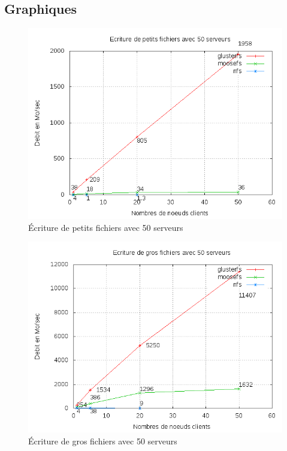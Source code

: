 \documentclass[blue]{beamer}
\begin{document}
	\subsection{Graphiques}
		\begin{frame}
			\begin{figure}
				\includegraphics[width=0.75\linewidth]{../images/srv50ws2.png}
				\caption{Écriture de petits fichiers avec 50 serveurs}
			\end{figure}
		\end{frame}

		\begin{frame}
			\begin{figure}
				\includegraphics[width=0.75\linewidth]{../images/srv50wb2.png}
				\caption{Écriture de gros fichiers avec 50 serveurs}
			\end{figure}
		\end{frame}
\end{document}
